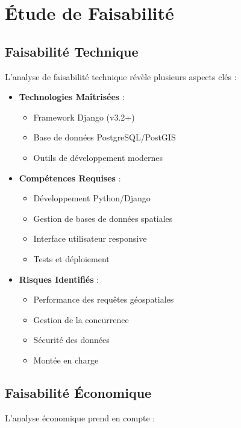 \section{Étude de Faisabilité}
\subsection{Faisabilité Technique}
L'analyse de faisabilité technique révèle plusieurs aspects clés :

\begin{itemize}
    \item \textbf{Technologies Maîtrisées} :
    \begin{itemize}
        \item Framework Django (v3.2+)
        \item Base de données PostgreSQL/PostGIS
        \item Outils de développement modernes
    \end{itemize}
    
    \item \textbf{Compétences Requises} :
    \begin{itemize}
        \item Développement Python/Django
        \item Gestion de bases de données spatiales
        \item Interface utilisateur responsive
        \item Tests et déploiement
    \end{itemize}
    
    \item \textbf{Risques Identifiés} :
    \begin{itemize}
        \item Performance des requêtes géospatiales
        \item Gestion de la concurrence
        \item Sécurité des données
        \item Montée en charge
    \end{itemize}
\end{itemize}

\subsection{Faisabilité Économique}
L'analyse économique prend en compte :

